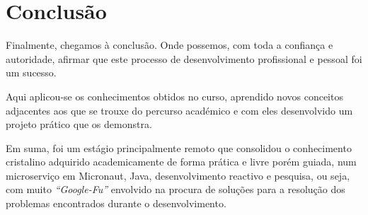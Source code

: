 \chapter{Conclusão}\label{cap6}

Finalmente, chegamos à conclusão. Onde possemos, com toda a confiança e autoridade, afirmar que este processo de desenvolvimento profissional e pessoal foi um sucesso.

Aqui aplicou-se os conhecimentos obtidos no curso, aprendido novos conceitos adjacentes aos que se trouxe do percurso académico e com eles desenvolvido um projeto prático que os demonstra.

Em suma, foi um estágio principalmente remoto que consolidou o conhecimento cristalino adquirido academicamente de forma prática e livre porém guiada, num microserviço em Micronaut, Java, desenvolvimento reactivo e pesquisa, ou seja, com muito \textit{``Google-Fu''} envolvido na procura de soluções para a resolução dos problemas encontrados durante o desenvolvimento.